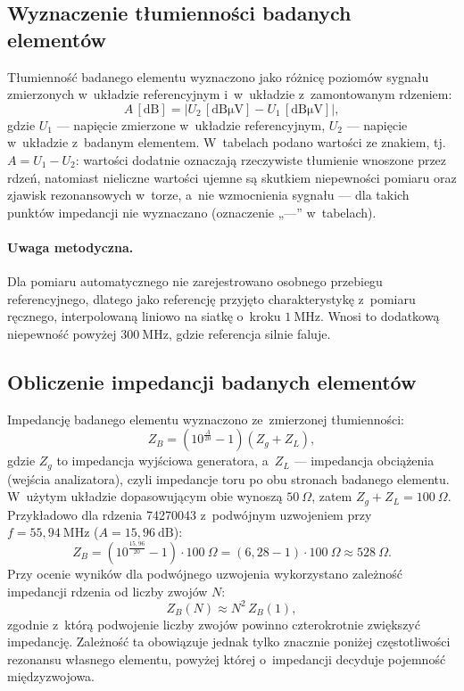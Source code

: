 \documentclass[11pt,a4paper]{article}
\newcommand{\Zsum}{100\ \Omega}
\begin{document}
\subsection{Wyznaczenie tłumienności badanych elementów}

Tłumienność badanego elementu wyznaczono jako różnicę poziomów sygnału zmierzonych
w~układzie referencyjnym i~w~układzie z~zamontowanym rdzeniem:
\begin{equation}
A\,[\mathrm{dB}] = \left| U_2\,[\mathrm{dB\mu V}] - U_1\,[\mathrm{dB\mu V}] \right|,
\label{eq:tlumiennosc}
\end{equation}
gdzie $U_1$ --- napięcie zmierzone w~układzie referencyjnym,
$U_2$ --- napięcie w~układzie z~badanym elementem. W~tabelach podano wartości
ze znakiem, tj. $A = U_1 - U_2$: wartości dodatnie oznaczają rzeczywiste tłumienie
wnoszone przez rdzeń, natomiast nieliczne wartości ujemne są skutkiem niepewności pomiaru
oraz zjawisk rezonansowych w~torze, a~nie wzmocnienia sygnału --- dla takich punktów
impedancji nie wyznaczano (oznaczenie „---” w~tabelach).

\paragraph{Uwaga metodyczna.} Dla pomiaru automatycznego nie zarejestrowano osobnego
przebiegu referencyjnego, dlatego jako referencję przyjęto charakterystykę z~pomiaru
ręcznego, interpolowaną liniowo na siatkę o~kroku $1\ \mathrm{MHz}$. Wnosi to dodatkową
niepewność powyżej $300\ \mathrm{MHz}$, gdzie referencja silnie faluje.

\subsection{Obliczenie impedancji badanych elementów}

Impedancję badanego elementu wyznaczono ze~zmierzonej tłumienności:
\begin{equation}
Z_B = \left( 10^{\frac{A}{20}} - 1 \right)\left( Z_g + Z_L \right),
\label{eq:impedancja}
\end{equation}
gdzie $Z_g$ to impedancja wyjściowa generatora, a~$Z_L$ --- impedancja obciążenia
(wejścia analizatora), czyli impedancje toru po obu stronach badanego elementu.
W~użytym układzie dopasowującym obie wynoszą $50\ \Omega$, zatem $Z_g + Z_L = \Zsum$. Przykładowo dla rdzenia
74270043 z~podwójnym uzwojeniem przy $f = 55{,}94\ \mathrm{MHz}$
($A = 15{,}96\ \mathrm{dB}$):
\begin{equation}
Z_B = \left( 10^{\frac{15{,}96}{20}} - 1 \right) \cdot 100\ \Omega
    = \left( 6{,}28 - 1 \right) \cdot 100\ \Omega \approx 528\ \Omega .
\end{equation}
Przy ocenie wyników dla podwójnego uzwojenia wykorzystano zależność impedancji
rdzenia od liczby zwojów $N$:
\begin{equation}
Z_B(N) \approx N^2 \, Z_B(1),
\label{eq:n2}
\end{equation}
zgodnie z~którą podwojenie liczby zwojów powinno czterokrotnie zwiększyć
impedancję. Zależność ta obowiązuje jednak tylko znacznie poniżej częstotliwości
rezonansu własnego elementu, powyżej której o~impedancji decyduje pojemność
międzyzwojowa.
\end{document}
